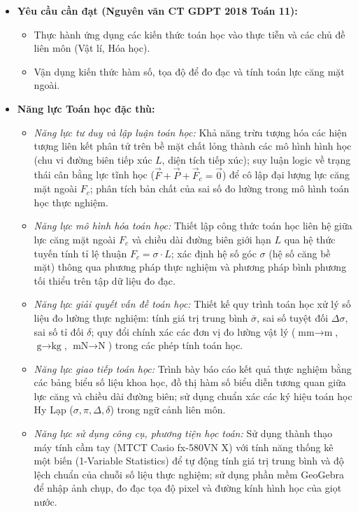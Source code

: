 \documentclass[12pt, a4paper]{article}
\renewcommand{\vec}[1]{\overrightarrow{#1}}
\begin{document}
\begin{itemize}[leftmargin=1.2cm]
    \item \textbf{Yêu cầu cần đạt (Nguyên văn CT GDPT 2018 Toán 11):}
    \begin{itemize}[leftmargin=0.6cm]
        \item Thực hành ứng dụng các kiến thức toán học vào thực tiễn và các chủ đề liên môn (Vật lí, Hóa học).
        \item Vận dụng kiến thức hàm số, tọa độ để đo đạc và tính toán lực căng mặt ngoài.
    \end{itemize}

    \item \textbf{Năng lực Toán học đặc thù:}
    \begin{itemize}[leftmargin=0.6cm]
        \item \textit{Năng lực tư duy và lập luận toán học:} Khả năng trừu tượng hóa các hiện tượng liên kết phân tử trên bề mặt chất lỏng thành các mô hình hình học (chu vi đường biên tiếp xúc $L$, diện tích tiếp xúc); suy luận logic về trạng thái cân bằng lực tĩnh học ($\vec{F} + \vec{P} + \vec{F}_c = \vec{0}$) để cô lập đại lượng lực căng mặt ngoài $F_c$; phân tích bản chất của sai số đo lường trong mô hình toán học thực nghiệm.
        \item \textit{Năng lực mô hình hóa toán học:} Thiết lập công thức toán học liên hệ giữa lực căng mặt ngoài $F_c$ và chiều dài đường biên giới hạn $L$ qua hệ thức tuyến tính tỉ lệ thuận $F_c = \sigma \cdot L$; xác định hệ số góc $\sigma$ (hệ số căng bề mặt) thông qua phương pháp thực nghiệm và phương pháp bình phương tối thiểu trên tập dữ liệu đo đạc.
        \item \textit{Năng lực giải quyết vấn đề toán học:} Thiết kế quy trình toán học xử lý số liệu đo lường thực nghiệm: tính giá trị trung bình $\bar{\sigma}$, sai số tuyệt đối $\Delta \sigma$, sai số tỉ đối $\delta$; quy đổi chính xác các đơn vị đo lường vật lý ($\text{mm} \to \text{m}$, $\text{g} \to \text{kg}$, $\text{mN} \to \text{N}$) trong các phép tính toán học.
        \item \textit{Năng lực giao tiếp toán học:} Trình bày báo cáo kết quả thực nghiệm bằng các bảng biểu số liệu khoa học, đồ thị hàm số biểu diễn tương quan giữa lực căng và chiều dài đường biên; sử dụng chuẩn xác các ký hiệu toán học Hy Lạp ($\sigma, \pi, \Delta, \delta$) trong ngữ cảnh liên môn.
        \item \textit{Năng lực sử dụng công cụ, phương tiện học toán:} Sử dụng thành thạo máy tính cầm tay (MTCT Casio fx-580VN X) với tính năng thống kê một biến (1-Variable Statistics) để tự động tính giá trị trung bình và độ lệch chuẩn của chuỗi số liệu thực nghiệm; sử dụng phần mềm GeoGebra để nhập ảnh chụp, đo đạc tọa độ pixel và đường kính hình học của giọt nước.
    \end{itemize}


\end{itemize}
\end{document}
